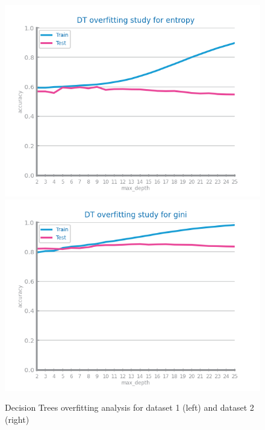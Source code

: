 \documentclass[10pt]{extarticle}
\begin{document}
\begin{figure}[H]
\centering\includegraphics[scale=0.7]{images/dataset1/models_evaluation/CovidPos_dt_accuracy_overfitting.png}
\includegraphics[scale=0.7]{images/dataset2/models_evaluation/Credit_Score_DT_overfitting.png}
\caption{Decision Trees overfitting analysis for dataset 1 (left) and dataset 2 (right)}
\end{figure}
\end{document}
